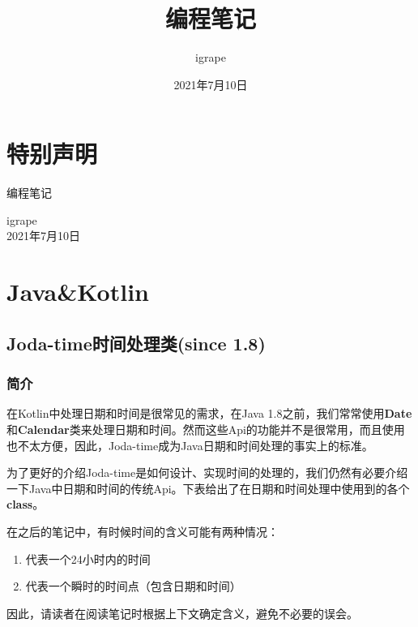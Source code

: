 \documentclass[cn,10pt,math=newtx,citestyle=gb7714-2015,bibstyle=gb7714-2015]{elegantbook}
\title{编程笔记}
\author{igrape}
\institute{TropicalTeamYard}
\date{2021年7月10日}
\begin{document}
    \maketitle

    \frontmatter

    \chapter*{特别声明}


    编程笔记

    \begin{flushright}
    igrape \\
    2021年7月10日
    \end{flushright}
    
    \tableofcontents

    \mainmatter

    \chapter{Java\&Kotlin}

    \section{Joda-time时间处理类(since 1.8)\label{section_1}}

    \begin{flushright}
    \end{flushright}

    \subsection{简介}

    在Kotlin中处理日期和时间是很常见的需求，在Java 1.8之前，我们常常使用\textbf{Date}和\textbf{Calendar}类来处理日期和时间。然而这些Api的功能并不是很常用，而且使用也不太方便，因此，Joda-time成为Java日期和时间处理的事实上的标准。

    为了更好的介绍Joda-time是如何设计、实现时间的处理的，我们仍然有必要介绍一下Java中日期和时间的传统Api。下表给出了在日期和时间处理中使用到的各个\textbf{class}。

    \begin{note}
        在之后的笔记中，有时候时间的含义可能有两种情况：
        \begin{enumerate}
            \item 代表一个24小时内的时间
            \item 代表一个瞬时的时间点（包含日期和时间）
        \end{enumerate}
        因此，请读者在阅读笔记时根据上下文确定含义，避免不必要的误会。
    \end{note}
\end{document}
